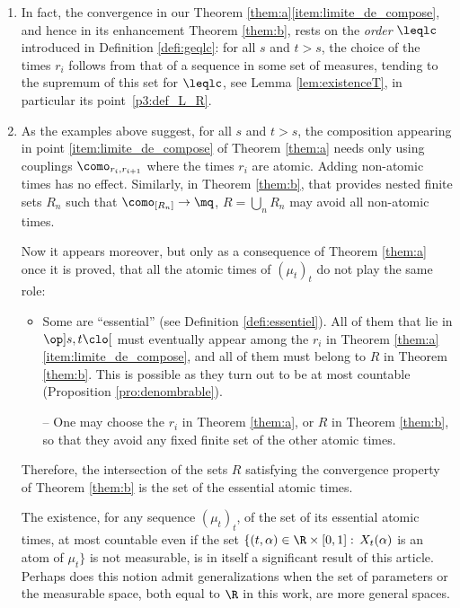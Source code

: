 \skpt
\begin{rem}\label{rem:choix}
\begin{enumerate}
\item
In fact, the convergence in our Theorem \ref{them:a}\eqref{item:limite_de_compose}, and hence in its enhancement Theorem \ref{them:b}, rests on the \emph{order} $\leqlc$ introduced in Definition \ref{defi:geqlc}: for all $s$ and $t>s$, the choice of the times $r_i$ follows from that of a sequence in some set of measures, tending to the supremum of this set for $\leqlc$, see Lemma \ref{lem:existenceT}, in particular its point~\eqref{p3:def_L_R}.

\item
As the examples above suggest, for all $s$ and $t>s$, the composition appearing in point \eqref{item:limite_de_compose} of Theorem \ref{them:a} needs only using couplings $\como_{r_i,r_{i+1}}$ where the times $r_i$ are atomic. Adding non-atomic times has no effect. Similarly, in Theorem \ref{them:b}, that provides nested finite sets $R_n$ such that $\como_{[R_n]}\to\mq$, $R=\bigcup_nR_n$ may avoid all non-atomic times.

Now it appears moreover, but only as a consequence of Theorem \ref{them:a} once it is proved, that all the atomic times of $(\mu_t)_t$ do not play the same role:
\begin{itemize}
\item
Some are ``essential'' (see Definition \ref{defi:essentiel}). All of them that lie in $\op]s,t\clo[$ must eventually appear among the $r_i$ in Theorem \ref{them:a}\eqref{item:limite_de_compose}, and all of them must belong to $R$ in Theorem \ref{them:b}. This is possible as they turn out to be at most countable (Proposition \ref{pro:denombrable}).

-- One may choose the $r_i$ in Theorem \ref{them:a}, or $R$ in Theorem \ref{them:b}, so that they avoid any fixed finite set of the other atomic times.
\end{itemize}
Therefore, the intersection of the sets $R$ satisfying the convergence property of Theorem \ref{them:b} is the set of the essential atomic times.

The existence, for any sequence $(\mu_t)_t$, of the set of its essential atomic times, at most countable even if the set $\{(t,\alpha)\in\R\times[0,1]:\,X_t(\alpha)$ is an atom of $\mu_t\}$ is not measurable, is in itself a significant result of this article. Perhaps does this notion admit generalizations when the set of parameters or the measurable space, both equal to $\R$ in this work, are more general spaces.
\end{enumerate}
\end{rem}

